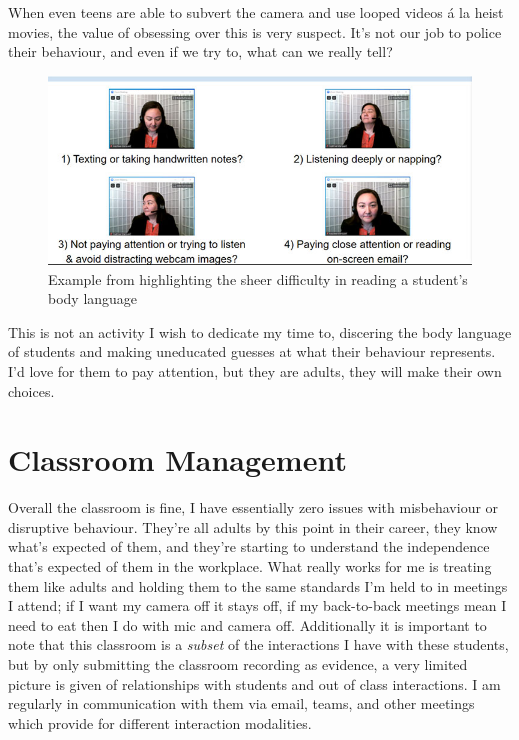\documentclass[paper=a4,justified,a4paper]{tufte-handout}
\begin{document}
When even teens are able to subvert the camera \citep{vice} and use
looped videos á la heist movies, the value of obsessing over this is
very suspect. It's not our job to police their behaviour, and even if we
try to, what can we really tell?

\begin{figure}
\centering
\includegraphics{educase.jpg}
\caption{Example from \citep{educase} highlighting the sheer difficulty
in reading a student's body language}
\end{figure}

This is not an activity I wish to dedicate my time to, discering the
body language of students and making uneducated guesses at what their
behaviour represents. I'd love for them to pay attention, but they are
adults, they will make their own choices.

\hypertarget{sec:report}{%
\section{Classroom Management}\label{sec:report}}

Overall the classroom is fine, I have essentially zero issues with
misbehaviour or disruptive behaviour. They're all adults by this point
in their career, they know what's expected of them, and they're starting
to understand the independence that's expected of them in the workplace.
What really works for me is treating them like adults and holding them
to the same standards I'm held to in meetings I attend; if I want my
camera off it stays off, if my back-to-back meetings mean I need to eat
then I do with mic and camera off. Additionally it is important to note
that this classroom is a \emph{subset} of the interactions I have with
these students, but by only submitting the classroom recording as
evidence, a very limited picture is given of relationships with students
and out of class interactions. I am regularly in communication with them
via email, teams, and other meetings which provide for different
interaction modalities.


\end{document}
